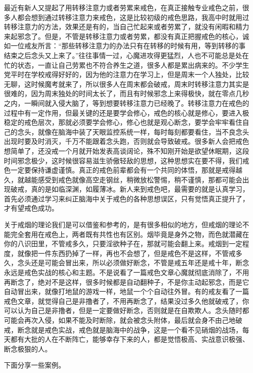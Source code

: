 最近有新人又提起了用转移注意力或者劳累来戒色，在真正接触专业戒色之前，很多人都会想到通过转移注意力来戒色，这是比较初级的戒色思路，我高中时就用过转移注意力的方法，效果还是有的，当自己忙起来或者劳累了，就没有闲暇和精力来起邪念了。但是，不管是转移注意力或者劳累，都没有真正把握戒色的核心，诚如一位戒友所言：“那些转移注意力的办法只有在转移的时候有用，等到转移的事结束之后念头又上来了。”往往事情一过，心魔进攻得更猛烈，人也不可能总是处在忙的状态，一直让自己劳累也不符合养生之道，很多人都是累出病来的。不少学生党平时在学校戒得好好的，因为他的注意力在学习上，但是周末一个人独处，比较无聊，这时候魔考就来了，所以很多人在周末都会破戒，周末时转移注意力其实是很难的，因为周末独处的时间太长了，而且有时候邪念上来得极快，就在零点几秒之内，一瞬间就入侵大脑了，等到想要转移注意力已经晚了。转移注意力在戒色的过程中有一定作用，但最关键的还是要学会修心，戒色的核心就是修心，要进入极稳定的戒色层次，那就必须要学会修心，修心也就是观心断念，要学会牢牢看住自己的念头，就像在脑海中装了天眼监控系统一样，每时每刻都要看住，当不良念头出现时要及时消灭，千万不能跟着念头跑，否则就会导致破戒。很多新人会把戒色想简单了，还没戒一个月就开始发表高谈阔论，殊不知刚开始是欲望休眠期，这段时间邪念极少，这时候很容易滋生骄傲轻敌的思想，这种思想实在要不得，我们戒色一定要保持谦虚谨慎。真正的戒色前辈都会有一个共同的体悟，那就是戒得越久，就越能感受到戒色就像高空走钢丝，稍微放松警惕，稍不谨慎，那都可能会出现破戒，真的是如临深渊，如履薄冰。新人来到戒色吧，最需要的就是认真学习，首先必须通过学习来纠正脑海中关于戒色的各种思想误区，只有觉悟真正提升了，才有望戒色成功。

关于戒烟的理论我们是可以借鉴和参考的，是有很多相似的地方，但戒烟的理论不能完全套用在戒色上，两者既有共性也有区别。烟毕竟是身外之物，而色就潜藏在你的八识田里，不管戒多久，只要淫欲种子在，那就可能会翻上来。戒烟到一定程度，就像把一件东西扔掉了一样，再也不会想了，但是戒色不是这样，不管戒多久，念头还是可能会冒出来，所以必须做好断念，不管是戒五年还是戒十年，断念永远是戒色实战的核心和主题。不是说看了一篇戒色文章心魔就彻底消除了，不用再断念了，绝对不是这样，很多时候都是自动翻种子，不是你主动起邪念，而是它自动冒出来，就像打地鼠的游戏一样，地鼠一个个自动往外冒。有的戒友看了一篇戒色文章，就觉得自己是非撸者了，不用再断念了，结果没过多久他就破戒了，你可以认为自己是非撸者，但是一定要做好断念，否则就是在自欺欺人。念头随时都可能会再次入侵，如果不能及时断除，就会被念头附体，最后就会身不由己地破戒，断念就是戒色实战，戒色就是脑海中的战争，这是一个看不见硝烟的战场，每天都有大批的人在不断阵亡，能够幸存下来的人，都是觉悟极高、实战意识极强、断念极狠的人。

下面分享一些案例。


